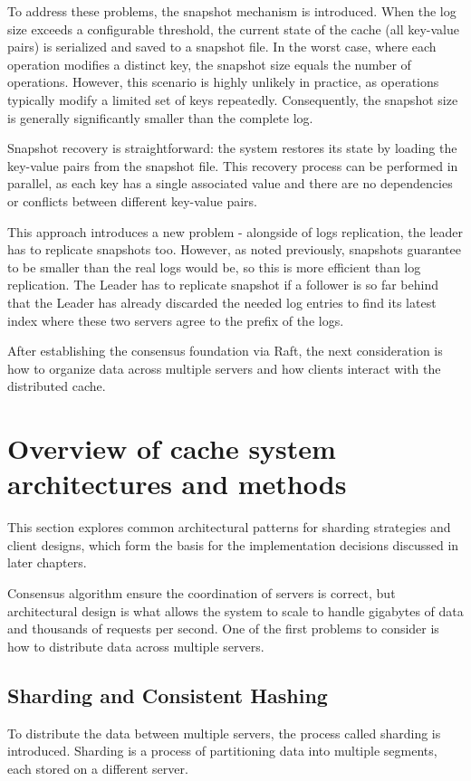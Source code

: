 \documentclass[shortabstract]{iithesis}
\begin{document}
To address these problems, the snapshot mechanism is introduced. When the log size exceeds a configurable threshold, the current state of the cache (all key-value pairs) is serialized and saved to a snapshot file. In the worst case, where each operation modifies a distinct key, the snapshot size equals the number of operations. However, this scenario is highly unlikely in practice, as operations typically modify a limited set of keys repeatedly. Consequently, the snapshot size is generally significantly smaller than the complete log.

Snapshot recovery is straightforward: the system restores its state by loading the key-value pairs from the snapshot file. This recovery process can be performed in parallel, as each key has a single associated value and there are no dependencies or conflicts between different key-value pairs. 

This approach introduces a new problem - alongside of logs replication, the leader has to replicate snapshots too. However, as noted previously, snapshots guarantee to be smaller than the real logs would be, so this is more efficient than log replication. The Leader has to replicate snapshot if a follower is so far behind that the Leader has already discarded the needed log entries to find its latest index where these two servers agree to the prefix of the logs. 

After establishing the consensus foundation via Raft, the next consideration is how to organize data across multiple servers and how clients interact with the distributed cache. 

\section{Overview of cache system architectures and methods}
This section explores common architectural patterns for sharding strategies and client designs, which form the basis for the implementation decisions discussed in later chapters.

Consensus algorithm ensure the coordination of servers is correct, but architectural design is what allows the system to scale to handle gigabytes of data and thousands of requests per second. One of the first problems to consider is how to distribute data across multiple servers.

\subsection{Sharding and Consistent Hashing}
To distribute the data between multiple servers, the process called sharding is introduced. Sharding is a process of partitioning data into multiple segments, each stored on a different server. 
\end{document}
